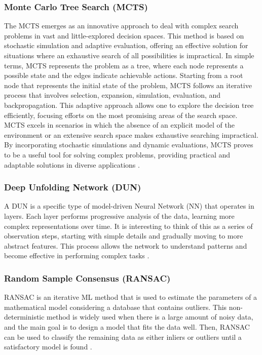 \documentclass[conference]{IEEEtran}
\begin{document}
\subsubsection{Monte Carlo Tree Search (MCTS)}
The MCTS emerges as an innovative approach to deal with complex search problems in vast and little-explored decision spaces. This method is based on stochastic simulation and adaptive evaluation, offering an effective solution for situations where an exhaustive search of all possibilities is impractical. In simple terms, MCTS represents the problem as a tree, where each node represents a possible state and the edges indicate achievable actions. Starting from a root node that represents the initial state of the problem, MCTS follows an iterative process that involves selection, expansion, simulation, evaluation, and backpropagation. This adaptive approach allows one to explore the decision tree efficiently, focusing efforts on the most promising areas of the search space. MCTS excels in scenarios in which the absence of an explicit model of the environment or an extensive search space makes exhaustive searching impractical. By incorporating stochastic simulations and dynamic evaluations, MCTS proves to be a useful tool for solving complex problems, providing practical and adaptable solutions in diverse applications \cite{b160}.

\subsubsection{Deep Unfolding Network (DUN)}
A DUN is a specific type of model-driven Neural Network (NN) that operates in layers. Each layer performs progressive analysis of the data, learning more complex representations over time. It is interesting to think of this as a series of observation steps, starting with simple details and gradually moving to more abstract features. This process allows the network to understand patterns and become effective in performing complex tasks \cite{b161}.

\subsubsection{Random Sample Consensus (RANSAC)}
RANSAC is an iterative ML method that is used to estimate the parameters of a mathematical model considering a database that contains outliers. This non-deterministic method is widely used when there is a large amount of noisy data, and the main goal is to design a model that fits the data well. Then, RANSAC can be used to classify the remaining data as either inliers or outliers until a satisfactory model is found \cite{b134}.
\end{document}
